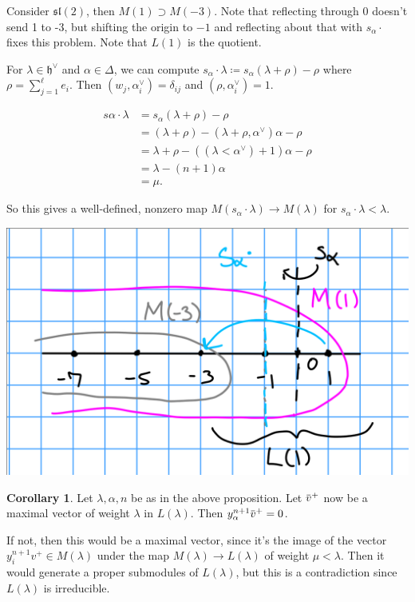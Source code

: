 \documentclass[11pt]{scrartcl}
\theoremstyle{definition}
\theoremstyle{theorem}
\newtheorem{corollary}[theorem]{Corollary}
\theoremstyle{proof}
\newenvironment{proof}
{\pushQED{$\qed$}\pf}
{\par\popQED\endpf}
\theoremstyle{definition}
\theoremstyle{break}
\theoremstyle{problem}
\newcommand{\definedas}[0]{\coloneqq}
\newcommand{\dual}[0]{^\vee}
\newcommand{\lieh}[0]{{\mathfrak{h}}}
\newcommand{\liesl}[0]{{\mathfrak{sl}}}
\renewcommand{\bar}[1]{\mkern 1.5mu\overline{\mkern-1.5mu#1\mkern-1.5mu}\mkern 1.5mu}
\renewcommand{\qed}[0]{\hfill\blacksquare}
\renewcommand{\to}[0]{\longrightarrow}
\begin{document}
Consider \(\liesl(2)\), then \(M(1) \supset M(-3)\). Note that
reflecting through 0 doesn't send 1 to -3, but shifting the origin to
\(-1\) and reflecting about that with \(s_\alpha \cdot\) fixes this
problem. Note that \(L(1)\) is the quotient.

For \(\lambda \in \lieh\dual\) and \(\alpha \in \Delta\), we can compute
\(s_\alpha \cdot \lambda \definedas s_\alpha(\lambda + \rho) - \rho\)
where \(\rho = \sum_{j=1}^\ell e_i\). Then
\((w_j, \alpha_i\dual) = \delta_{ij}\) and
\((\rho, \alpha_i\dual) = 1\).

\begin{align*}
s\alpha \cdot \lambda 
&= s_\alpha(\lambda + \rho) - \rho \\
&= (\lambda + \rho) - (\lambda + \rho, \alpha\dual)\alpha -\rho \\
&= \lambda + \rho - ((\lambda< \alpha\dual) +1)\alpha - \rho \\
&= \lambda - (n+1)\alpha \\
&= \mu
.\end{align*}

So this gives a well-defined, nonzero map
\(M(s_\alpha \cdot \lambda) \to M(\lambda)\) for
\(s_\alpha \cdot \lambda < \lambda\).

\includegraphics{figures/2020-01-27-09:35.png}\\

\begin{corollary}

Let \(\lambda, \alpha, n\) be as in the above proposition. Let
\(\bar v^+\) now be a maximal vector of weight \(\lambda\) in
\(L(\lambda)\). Then \(y_\alpha^{n+1} \bar v^+ = 0\).\end{corollary}

\begin{proof}

If not, then this would be a maximal vector, since it's the image of the
vector \(y_i^{n+1}v^+ \in M(\lambda)\) under the map
\(M(\lambda) \to L(\lambda)\) of weight \(\mu < \lambda\). Then it would
generate a proper submodules of \(L(\lambda)\), but this is a
contradiction since \(L(\lambda)\) is irreducible.\end{proof}
\end{document}
